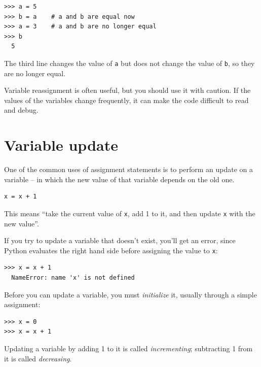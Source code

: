 \begin{Verbatim}[frame=single]
>>> a = 5
>>> b = a    # a and b are equal now
>>> a = 3    # a and b are no longer equal
>>> b
  5
\end{Verbatim}
%
The third line changes the value of \texttt{a} but does not change the value of \texttt{b}, so they are no longer equal.

Variable reassignment is often useful, but you should use it with caution. If the values of the variables change frequently, it can make the code difficult to read and debug.



\hypertarget{update}{%
\section{Variable update}\label{update}}

 

One of the common uses of assignment statements is to perform an update on a variable -- in which the new value of that variable depends on the old one.

\begin{Verbatim}[frame=single]
x = x + 1
\end{Verbatim}

This means ``take the current value of \texttt{x}, add 1 to it, and then update \texttt{x} with the new value''.

If you try to update a variable that doesn't exist, you'll get an error, since Python evaluates the right hand side before assigning the value to \texttt{x}:

\begin{Verbatim}[frame=single]
>>> x = x + 1
  NameError: name 'x' is not defined
\end{Verbatim}

Before you can update a variable, you must \emph{initialize} it, usually through a simple assignment:


\begin{Verbatim}[frame=single]
>>> x = 0
>>> x = x + 1
\end{Verbatim}

Updating a variable by adding 1 to it is called \emph{incrementing}; subtracting 1 from it is called \emph{decreasing}.

 

